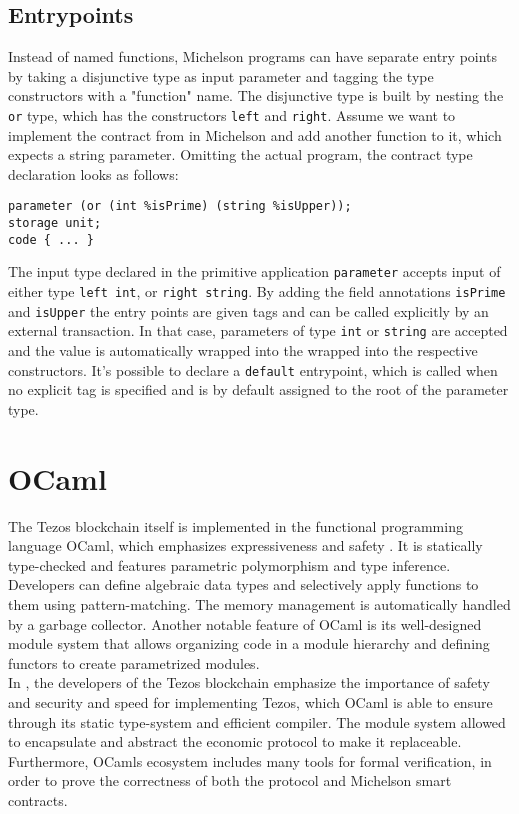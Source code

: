 
\subsection{Entrypoints}
Instead of named functions, Michelson programs can have separate entry points by taking a disjunctive type as input parameter and tagging the type constructors with a "function" name. The disjunctive type is built by nesting the \texttt{or} type, which has the constructors \texttt{left} and \texttt{right}. Assume we want to implement the contract from  in Michelson and add another function to it, which expects a string parameter. Omitting the actual program, the contract type declaration looks as follows:
\begin{lstlisting}[language=Michelson, numbers=none]
parameter (or (int %isPrime) (string %isUpper));
storage unit;
code { ... }
\end{lstlisting}
The input type declared in the primitive application \texttt{parameter} accepts input of either type \texttt{left int}, or \texttt{right string}. By adding the field annotations \texttt{isPrime} and \texttt{isUpper} the entry points are given tags and can be called explicitly by an external transaction. In that case, parameters of type \texttt{int} or \texttt{string} are accepted and the value is automatically wrapped into the wrapped into the respective constructors. It's possible to declare a \texttt{default} entrypoint, which is called when no explicit tag is specified and is by default assigned to the root of the parameter type.


\section{OCaml}
The Tezos blockchain itself is implemented in the functional programming language OCaml, which emphasizes expressiveness and safety \cite{ocaml_doc}. It is statically type-checked and features parametric polymorphism and type inference. Developers can define algebraic data types and selectively apply functions to them using pattern-matching. The memory management is automatically handled by a garbage collector. Another notable feature of OCaml is its well-designed module system that allows organizing code in a module hierarchy and defining functors to create parametrized modules.\\
In \cite{canou_tezos_nodate}, the developers of the Tezos blockchain emphasize the importance of safety and security and speed for implementing Tezos, which OCaml is able to ensure through its static type-system and efficient compiler. The module system allowed to encapsulate and abstract the economic protocol to make it replaceable. Furthermore, OCamls ecosystem includes many tools for formal verification, in order to prove the correctness of both the protocol and Michelson smart contracts.

